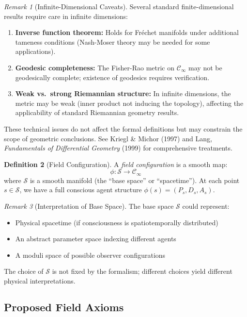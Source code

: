 \documentclass[11pt,a4paper]{article}
\theoremstyle{definition}
\newtheorem{definition}{Definition}[section]
\theoremstyle{plain}
\theoremstyle{remark}
\newtheorem{remark}[definition]{Remark}
\begin{document}
\begin{remark}[Infinite-Dimensional Caveats]
Several standard finite-dimensional results require care in infinite dimensions:
\begin{enumerate}[label=(\roman*)]
    \item \textbf{Inverse function theorem:} Holds for Fr\'echet manifolds under additional tameness conditions (Nash-Moser theory may be needed for some applications).
    \item \textbf{Geodesic completeness:} The Fisher-Rao metric on $\mathcal{C}_\infty$ may not be geodesically complete; existence of geodesics requires verification.
    \item \textbf{Weak vs.\ strong Riemannian structure:} In infinite dimensions, the metric may be weak (inner product not inducing the topology), affecting the applicability of standard Riemannian geometry results.
\end{enumerate}
These technical issues do not affect the formal definitions but may constrain the scope of geometric conclusions. See Kriegl \& Michor (1997) and Lang, \textit{Fundamentals of Differential Geometry} (1999) for comprehensive treatments.
\end{remark}

\begin{definition}[Field Configuration]
A \emph{field configuration} is a smooth map:
\[
\phi: \mathcal{S} \to \mathcal{C}_\infty
\]
where $\mathcal{S}$ is a smooth manifold (the ``base space'' or ``spacetime''). At each point $s \in \mathcal{S}$, we have a full conscious agent structure $\phi(s) = (P_s, D_s, A_s)$.
\end{definition}

\begin{remark}[Interpretation of Base Space]
The base space $\mathcal{S}$ could represent:
\begin{itemize}
    \item Physical spacetime (if consciousness is spatiotemporally distributed)
    \item An abstract parameter space indexing different agents
    \item A moduli space of possible observer configurations
\end{itemize}
The choice of $\mathcal{S}$ is not fixed by the formalism; different choices yield different physical interpretations.
\end{remark}

\subsection{Proposed Field Axioms}
\end{document}
